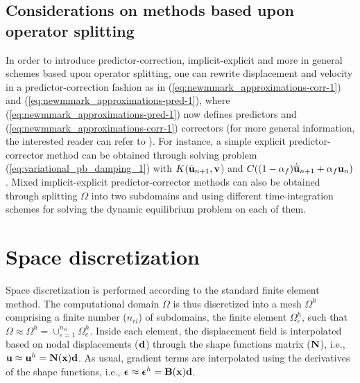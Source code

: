\subsection{Considerations on methods based upon operator splitting}

In order to introduce predictor-correction, implicit-explicit and
more in general schemes based upon operator splitting, one can rewrite
displacement and velocity in a predictor-correction fashion as in
(\ref{eq:newmmark_approximations-corr-1}) and (\ref{eq:newmmark_approximations-pred-1}),
where (\ref{eq:newmmark_approximations-pred-1}) now defines predictors
and (\ref{eq:newmmark_approximations-corr-1}) correctors (for more general information, the interested reader can refer to \cite{hughes2012finite,zienkiewicz1994finite}). For
instance, a simple explicit predictor-corrector method can be obtained
through solving problem (\ref{eq:variational_pb_damping_1}) with
$K(\bar{{\bf{u}}}_{n+1},{\bf{v}}$) and $C((1-\alpha_{f})\dot{\overline{{\bf{u}}}}_{n+1}+\alpha_{f}{\bf{u}}_{n})$.
Mixed implicit-explicit predictor-corrector methods can also be obtained
through splitting $\Omega$ into two subdomains and using different
time-integration schemes for solving the dynamic equilibrium problem
on each of them.

\section{Space discretization}

Space discretization is performed according to the standard finite
element method. The computational domain $\Omega$ is thus discretized
into a mesh $\Omega^{h}$ comprising a finite number ($n_{el}$) of
subdomains, the finite element $\Omega_{e}^{h}$, such that $\Omega\approx\Omega^{h}=\cup_{e=1}^{n_{el}}\Omega_{e}^{h}$.
Inside each element, the displacement field is interpolated based
on nodal displacements (${\bf d}$) through the shape functions matrix
(${\bf N}$), i.e., ${\bf{u}}\approx{\bf{u}}^{h}={\bf N}({\bf{x}}){\bf d}$. As usual, gradient
terms are interpolated using the derivatives of the shape functions,
i.e., $\mbox{\boldmath${\epsilon}$}\approx\mbox{\boldmath${\epsilon}$}^{h}={\bf B}({\bf{x}}){\bf d}$.


